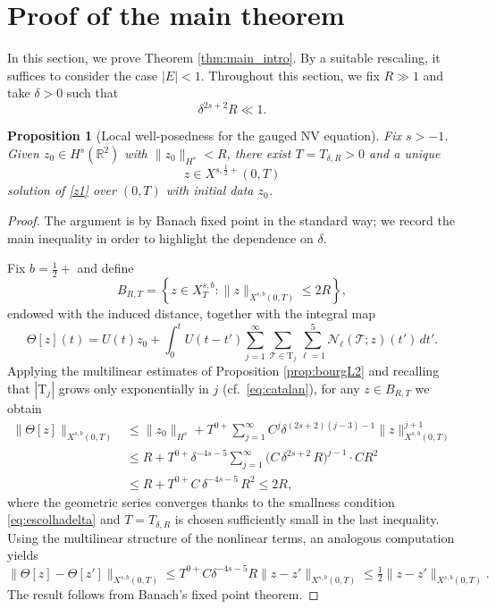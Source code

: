 \documentclass[a4paper,
11pt,  reqno]{amsart}
\newcommand{\5}{\textup{V}}
\newtheorem{proposition}[theorem]{Proposition}
\theoremstyle{remark}
\newcommand{\R}{\mathbb{R}}
\newcommand{\TT}{\mathcal{T}}
\newcommand{\Tr}{\mathrm{T}}
\renewcommand{\l}{\ell}
\numberwithin{equation}{section}
\numberwithin{theorem}{section}
\newcommand{\Ncal}{\mathcal{N}}
\begin{document}
\section{Proof of the main theorem}\label{sec:lwp}

In this section, we prove Theorem \ref{thm:main_intro}. By a suitable rescaling, it suffices to consider the case $|E|<1$. Throughout this section, we fix $R\gg 1$ and take $\delta>0$ such that
\begin{equation}\label{eq:escolhadelta}
\delta^{2s+2}R\ll 1.
\end{equation}

\begin{proposition}[Local well-posedness for the gauged NV equation]\label{prop:lwp_rnv}
Fix $s>-1$. Given $z_0\in H^s(\R^2)$ with $\|z_0\|_{H^s}<R$, there exist $T=T_{\delta,R}>0$ and a unique
$$
z\in X^{s,\frac12 +}(0,T)
$$
solution of \eqref{z1} over $(0,T)$ with initial data $z_0$.
\end{proposition}

\begin{proof}
The argument is by Banach fixed point in the standard way; we record the main inequality in order to highlight the dependence on $\delta$.

Fix $b=\frac12+$ and define
$$
B_{R,T}=\left\{ z\in X^{s,b}_T : \|z\|_{X^{s,b}(0,T)}\le 2R \right\},
$$
endowed with the induced distance, together with the integral map
$$
\Theta[z](t)=U(t)z_0 + \int_0^t U(t-t')\sum_{j=1}^\infty \sum_{\TT \in \Tr_j} \sum_{\l=1}^5  \Ncal_\l(\TT;z)(t')\,dt'.
$$
Applying the multilinear estimates of Proposition \ref{prop:bourgL2} and recalling that $|\Tr_j|$ grows only exponentially in $j$ (cf.~\eqref{eq:catalan}), for any $z\in B_{R,T}$ we obtain
\begin{align}
\|\Theta[z]\|_{X^{s,b}(0,T)}
&\le \|z_0\|_{H^s} + T^{0+}\sum_{j=1}^\infty C^j\delta^{(2s+2)(j-3)-1}\|z\|_{X^{s,b}(0,T)}^{j+1} \\
&\le R + T^{0+}\delta^{-4s-5}\sum_{j=1}^\infty \big(C \,\delta^{2s+2}\, R\big)^{j-1} \cdot C R^2 \\
&\le R + T^{0+} C \,\delta^{-4s-5}\, R^2 \le 2R,
\end{align}
where the geometric series converges thanks to the smallness condition \eqref{eq:escolhadelta} and $T=T_{\delta,R}$ is chosen sufficiently small in the last inequality. Using the multilinear structure of the nonlinear terms, an analogous computation yields
$$
\|\Theta[z]-\Theta[z']\|_{X^{s,b}(0,T)} \le T^{0+}C\delta^{-4s-5}R\|z-z'\|_{X^{s,b}(0,T)} \le \tfrac12\|z-z'\|_{X^{s,b}(0,T)}.
$$
The result follows from Banach's fixed point theorem.
\end{proof}
\end{document}
